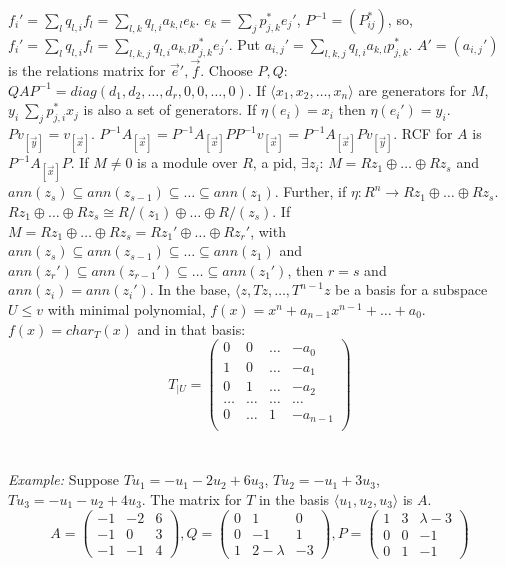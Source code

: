 $f_i' = \sum_l q_{l,i} f_l= \sum_{l,k} q_{l,i} a_{k,l} e_k$.  $e_k = \sum_j p^*_{j,k} e_j'$, $P^{-1}= (P^*_{ij})$, so,
$f_i' = \sum_l q_{l,i} f_l= \sum_{l,k,j} q_{l,i} a_{k,l} p^*_{j,k} e_j'$.  Put $a_{i,j}' = \sum_{l,k,j} q_{l,i} a_{k,l} p^*_{j,k}$.
$A' = (a_{i,j}')$ is the relations matrix for ${\vec e'}, {\vec f}$.  Choose $P, Q$: $QAP^{-1} = diag (d_1 , d_2 , \ldots , d_r , 0 ,0, \ldots , 0)$.
If $\langle x_1 , x_2 , \ldots , x_n \rangle$ are generators for $M$, $y_i \ \sum_j p^*_{j,i} x_j$ is also a set of
generators.  If $\eta (e_i) = x_i$ then $\eta (e_i')= y_i$.  $P v_{[{\vec y}]} = v_{[{\vec x}]}$.
$P^{-1} A_{[{\vec x}]} = P^{-1} A_{[{\vec x}]} P P^{-1} v_{[{\vec x}]} = P^{-1} A_{[{\vec x}]} P v_{[{\vec y}]}$.
RCF for $A$ is $P^{-1} A_{[{\vec x}]} P$.  If $M\ne 0$ is a module over $R$, a pid, $\exists z_i$: $M= R z_1 \oplus \ldots \oplus R z_s$ and
$ann(z_s)  \subseteq ann(z_{s-1}) \subseteq \ldots \subseteq ann(z_1)$.  Further, if $\eta: R^n \rightarrow R z_1 \oplus \ldots \oplus R z_s$.
$R z_1 \oplus \ldots \oplus R z_s \cong R/(z_1) \oplus \ldots \oplus R/(z_s)$.
If $M= R z_1 \oplus \ldots \oplus R z_s = R z_1' \oplus \ldots \oplus R z_r'$, with
$ann(z_s) \subseteq ann(z_{s-1}) \subseteq \ldots \subseteq ann(z_1)$ and
$ann(z_r')  \subseteq ann(z_{r-1}') \subseteq \ldots \subseteq ann(z_1')$, then $r=s$ and $ann(z_i) = ann(z_i')$.  In the base,
$\langle z , Tz, \ldots , T^{n-1}z$ be a basis for a subspace $U \leq v$ with minimal polynomial, $f(x) = x^n + a_{n-1}x^{n-1} + \ldots + a_0$.
$f(x) = char_T(x)$ and in that basis:
$$
T_{|U}=
\left(
\begin{array}{cccc}
0 & 0 & \ldots & -a_0 \\
1 & 0 & \ldots & -a_1 \\
0 & 1 & \ldots & -a_2 \\
\ldots & \ldots & \ldots & \ldots \\
0 & \ldots & 1 & -a_{n-1} \\
\end{array}
\right)
$$
\\
\\
\emph{Example:}
Suppose
$T u_1= -u_1 - 2 u_2 + 6 u_3$,
$T u_2= -u_1 + 3 u_3$,
$T u_3= -u_1 - u_2 + 4 u_3$.  The matrix for $T$ in the basis
$\langle u_1 , u_2 , u_3 \rangle$ is $A$.
$$
A=
\left(
\begin{array}{ccc}
-1 &  -2 &  6 \\
-1 &  0 &  3 \\
-1 &  -1 &  4
\end{array}
\right),
Q=
\left(
\begin{array}{ccc}
0 & 1 & 0\\
0 & -1 & 1\\
1 &  2-\lambda & -3
\end{array}
\right),
P=
\left(
\begin{array}{ccc}
1 & 3 & \lambda-3\\
0 & 0 & -1\\
0 & 1 &  -1
\end{array}
\right)
$$
